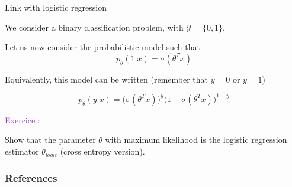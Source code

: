 \documentclass[usenames,dvipsnames]{beamer}
\newcounter{numexos}%
\newcommand{\exercice}[1]{%
\addtocounter{numexos}{1}%
\textcolor{DarkOrchid}{Exercice\,\thenumexos\,:}\,#1%
}
\begin{document}
\begin{frame}{Link with logistic regression}

    We consider a binary classification problem, with $\mathcal{Y} = \{0, 1\}$.

Let us now consider the probabilistic model such that
\begin{equation*}
    p_{\theta}(1|x) = \sigma(\theta^Tx)
\end{equation*}

    Equivalently, this model can be written (remember that $y=0$ or $y=1$)

\begin{equation}
    p_{\theta}(y|x) = \big(\sigma(\theta^Tx)\big)^y\big(1-\sigma(\theta^Tx) \big)^{1-y}
\end{equation}

    \exercice{}
    Show that the parameter $\theta$ with maximum likelihood is the logistic regression estimator $ \theta_{logit}$ (cross entropy version).

\end{frame}






\begin{frame}[allowframebreaks]
\frametitle{References}

 
\end{frame}
\end{document}
